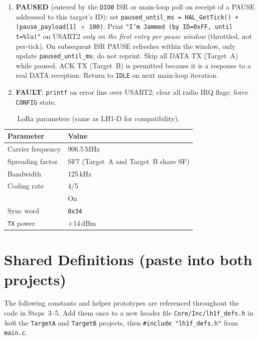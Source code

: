 \documentclass[11pt,letterpaper]{article}
\begin{document}
\begin{enumerate}[leftmargin=2em]
	\item \textbf{PAUSED} (entered by the \texttt{DIO0} ISR or main-loop poll on receipt of a PAUSE addressed to this target's ID): set \texttt{paused\_until\_ms = HAL\_GetTick() + (pause\_payload[1] $\times$ 100)}. Print \texttt{"I'm Jammed (by ID=0xFF, until t=\%lu)"} on USART2 \emph{only on the first entry per pause window} (throttled, not per-tick). On subsequent ISR PAUSE refreshes within the window, only update \texttt{paused\_until\_ms}; do not reprint. Skip all DATA TX (Target~A) while paused. ACK TX (Target~B) is permitted because it is a response to a real DATA reception. Return to \texttt{IDLE} on next main-loop iteration.
	\item \textbf{FAULT}: \texttt{printf} an error line over USART2; clear all radio IRQ flags; force \texttt{CONFIG} state.
\end{enumerate}

\newpage
\begin{table}[h!]
	\centering
	\caption{LoRa parameters (same as LH1-D for compatibility).}
	\label{tab:lora-params-f}
	\begin{tabular}{l l}
		\toprule
		\textbf{Parameter} & \textbf{Value} \\
		\midrule
		Carrier frequency & 906.5\,MHz \\
		Spreading factor & SF7 (Target~A and Target~B share SF) \\
		Bandwidth & 125\,kHz \\
		Coding rate & 4/5 \\
		\CRC{} & On \\
		Sync word & \texttt{0x34} \\
		\texttt{TX} power & +14\,dBm \\
		\bottomrule
	\end{tabular}
\end{table}

\newpage
\section{Shared Definitions (paste into both projects)}

The following constants and helper prototypes are referenced throughout the \FSM{} code in Steps~3--5. Add them once to a new header file \texttt{Core/Inc/lh1f\_defs.h} in \emph{both} the \texttt{TargetA} and \texttt{TargetB} projects, then \texttt{\#include "lh1f\_defs.h"} from \texttt{main.c}.
\end{document}
